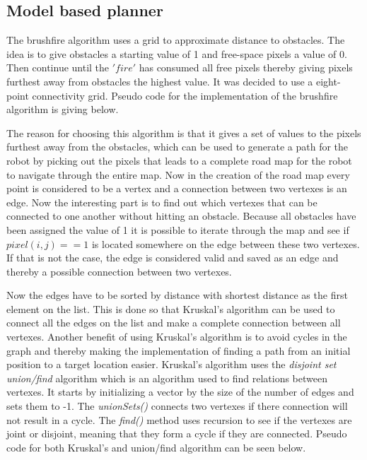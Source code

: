 \documentclass[../Head/Main.tex]{subfiles}
\begin{document}
\subsection{Model based planner}
The brushfire algorithm uses a grid to approximate distance to obstacles. The idea is to give obstacles a starting value of 1 and free-space pixels a value of 0. Then continue until the $'fire'$ has consumed all free pixels thereby giving pixels furthest away from obstacles the highest value. It was decided to use a eight-point connectivity grid. Pseudo code for the implementation of the brushfire algorithm is giving below. \par


The reason for choosing this algorithm is that it gives a set of values to the pixels furthest away from the obstacles, which can be used to generate a path for the robot by picking out the pixels that leads to a complete road map for the robot to navigate through the entire map. 
Now in the creation of the road map every point is considered to be a vertex and a connection between two vertexes is an edge. Now the interesting part is to find out which vertexes that can be connected to one another without hitting an obstacle. Because all obstacles have been assigned the value of 1 it is possible to iterate through the map and see if $pixel(i,j) == 1$ is located somewhere on the edge between these two vertexes. If that is not the case, the edge is considered valid and saved as an edge and thereby a possible connection between two vertexes. \par


Now the edges have to be sorted by distance with shortest distance as the first element on the list. This is done so that Kruskal's algorithm can be used to connect all the edges on the list and make a complete connection between all vertexes. Another benefit of using Kruskal's algorithm is to avoid cycles in the graph and thereby making the implementation of finding a path from an initial position to a target location easier. Kruskal's algorithm uses the \textit{disjoint set union/find} algorithm which is an algorithm used to find relations between vertexes. It starts by initializing a vector by the size of the number of edges and sets them to -1. The \textit{unionSets()} connects two vertexes if there connection will not result in a cycle.  The \textit{find()} method uses recursion to see if the vertexes are joint or disjoint, meaning that they form a cycle if they are connected. Pseudo code for both Kruskal's and union/find algorithm can be seen below.     
\end{document}
